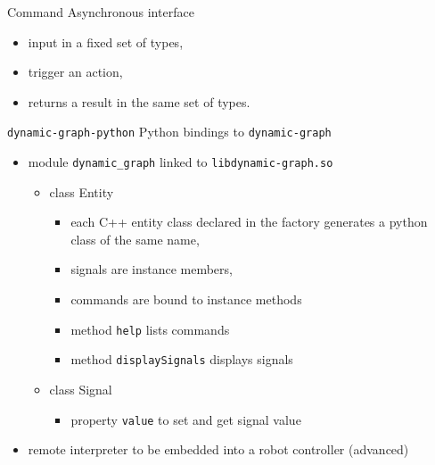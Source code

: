 %
%
\begin{frame} {Command}
  Asynchronous interface
  \begin{itemize}
  \item input in a fixed set of types,
  \item trigger an action,
  \item returns a result in the same set of types.
  \end{itemize}
\end{frame}

%
%
\begin {frame} {\texttt{dynamic-graph-python}}
  Python bindings to \texttt{dynamic-graph}
  \pause
  \begin{itemize}
  \item module \texttt{dynamic\_graph} linked to \texttt{libdynamic-graph.so}
  \pause
    \begin{itemize}
    \item class Entity
      \begin{itemize}
      \item each C++ entity class declared in the factory generates a python class of the same name,
      \item signals are instance members,
      \item commands are bound to instance methods
      \item method \texttt{help} lists commands
      \item method \texttt{displaySignals} displays signals
      \end{itemize}
  \pause
    \item class Signal
      \begin{itemize}
        \item property \texttt{value} to set and get signal value
      \end{itemize}
    \end{itemize}
  \pause
    \item remote interpreter to be embedded into a robot controller (advanced)
  \end{itemize}
\end{frame}

